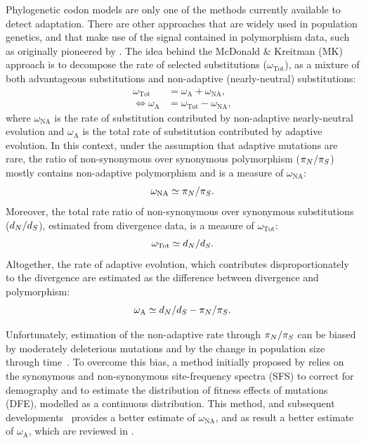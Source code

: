 Phylogenetic codon models are only one of the methods currently available to detect adaptation.
There are other approaches that are widely used in population genetics, and that make use of the signal contained in polymorphism data, such as originally pioneered by \citet{McDonald1991}.
The idea behind the McDonald \& Kreitman (\acrshort{MK}) approach is to decompose the rate of selected substitutions ($\omega_{\text{Tot}}$), as a mixture of both advantageous substitutions and non-adaptive (nearly-neutral) substitutions:
\begin{align}
    \omega_{\text{Tot}} & = \omega_{\text{A}} + \omega_{\text{NA}}, \\
    \iff \omega_{\text{A}} & = \omega_{\text{Tot}} - \omega_{\text{NA}},
\end{align}
where $\omega_{\text{NA}}$ is the rate of substitution contributed by non-adaptive nearly-neutral evolution and $\omega_{\text{A}}$ is the total rate of substitution contributed by adaptive evolution.
In this context, under the assumption that adaptive mutations are rare, the ratio of non-synonymous over synonymous polymorphism ($\pi_N / \pi_S$) mostly contains non-adaptive polymorphism and is a measure of $\omega_{\text{NA}}$:
\begin{equation}
    \omega_{\text{NA}} \simeq \pi_N / \pi_S.
\end{equation}
Moreover, the total rate ratio of non-synonymous over synonymous substitutions ($d_N / d_S$), estimated from divergence data, is a measure of $\omega_{\text{Tot}}$:
\begin{equation}
    \omega_{\text{Tot}} \simeq d_N / d_S.
\end{equation}
Altogether, the rate of adaptive evolution, which contributes disproportionately to the divergence are estimated as the difference between divergence and polymorphism:
\begin{equation}
    \omega_{\text{A}} \simeq d_N / d_S - \pi_N / \pi_S.
\end{equation}

Unfortunately, estimation of the non-adaptive rate through $\pi_N / \pi_S$ can be biased by moderately deleterious mutations and by the change in population size through time~\citep{eyre-walker_changing_2002}.
To overcome this bias, a method initially proposed by \citet{eyre-walker_estimating_2009, Galtier2016} relies on the synonymous and non-synonymous site-frequency spectra (\acrshort{SFS}) to correct for demography and to estimate the distribution of fitness effects of mutations (\acrshort{DFE}), modelled as a continuous distribution.
This method, and subsequent developments~\citep{Galtier2016} provides a better estimate of $\omega_{\text{NA}}$, and as result a better estimate of $\omega_{\text{A}}$, which are reviewed in \citet{Moutinho2019a}.

